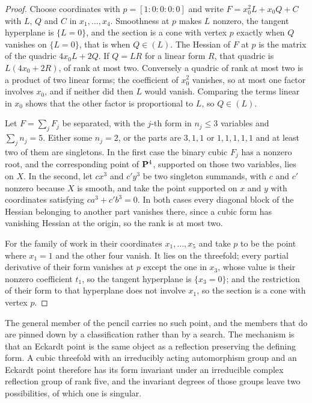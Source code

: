 \begin{proof}
Choose coordinates with \(p=[1:0:0:0:0]\) and write \(F=x_0^2L+x_0Q+C\) with
\(L\), \(Q\) and \(C\) in \(x_1,\dots,x_4\).  Smoothness at \(p\) makes \(L\)
nonzero, the tangent hyperplane is \(\{L=0\}\), and the section is a cone with
vertex \(p\) exactly when \(Q\) vanishes on \(\{L=0\}\), that is when
\(Q\in(L)\).  The Hessian of \(F\) at \(p\) is the matrix of the quadric
\(4x_0L+2Q\).  If \(Q=LR\) for a linear form \(R\), that quadric is
\(L(4x_0+2R)\), of rank at most two.  Conversely a quadric of rank at most
two is a product of two linear forms; the coefficient of \(x_0^2\) vanishes,
so at most one factor involves \(x_0\), and if neither did then \(L\) would
vanish.  Comparing the terms
linear in \(x_0\) shows that the other factor is proportional to \(L\), so
\(Q\in(L)\).

Let \(F=\sum_jF_j\) be separated, with the \(j\)-th form in \(n_j\le3\)
variables and \(\sum_jn_j=5\).  Either some \(n_j=2\), or the parts are
\(3,1,1\) or \(1,1,1,1,1\) and at least two of them are singletons.  In the
first case the binary cubic \(F_j\) has a nonzero root, and the corresponding
point of \(\mathbf P^4\), supported on those two variables, lies on \(X\).  In the
second, let \(cx^3\) and \(c'y^3\) be two singleton summands, with \(c\) and
\(c'\) nonzero because \(X\) is smooth, and take the point supported on \(x\)
and \(y\) with coordinates satisfying \(ca^3+c'b^3=0\).  In both cases every
diagonal block of the Hessian belonging to another part vanishes there, since
a cubic form has vanishing Hessian at the origin, so the rank is at most two.

For the family of \cite[Theorem~3.3]{YYZ} work in their coordinates
\(x_1,\dots,x_5\) and take \(p\) to be the point where \(x_1=1\) and the
other four vanish.  It lies on the threefold; every partial derivative of
their form vanishes at \(p\) except the one in \(x_3\), whose value is their
nonzero coefficient \(t_1\), so the tangent hyperplane is \(\{x_3=0\}\); and
the restriction of their form to that hyperplane does not involve \(x_1\), so
the section is a cone with vertex \(p\).
\end{proof}

The general member of the pencil carries no such point, and the members that
do are pinned down by a classification rather than by a search.  The
mechanism is that an Eckardt point is the same object as a reflection
preserving the defining form.  A cubic threefold with an irreducibly acting
automorphism group and an Eckardt point therefore has its form invariant
under an irreducible complex reflection group of rank five, and the invariant
degrees of those groups leave two possibilities, of which one is singular.

